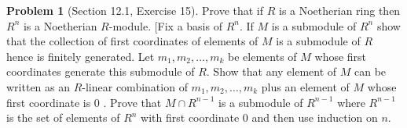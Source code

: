 \documentclass{amsart}
\numberwithin{equation}{section}
\theoremstyle{definition}
\newtheorem{problem}[thm]{Problem}
\begin{document}
\begin{problem}[Section 12.1, Exercise 15]
Prove that if \(R\) is a Noetherian ring then \(R^n\) is a Noetherian \(R\)-module. [Fix a basis of \(R^n\). If \(M\) is a submodule of \(R^n\) show that the collection of first coordinates of elements of \(M\) is a submodule of \(R\) hence is finitely generated. Let \(m_1, m_2, \ldots, m_k\) be elements of \(M\)
whose first coordinates generate this submodule of \(R\). Show that any element of \(M\) can be written as an \(R\)-linear combination of \(m_1, m_2, \ldots, m_k\) plus an element of \(M\) whose first coordinate is 0 . Prove that \(M \cap R^{n-1}\) is a submodule of \(R^{n-1}\) where \(R^{n-1}\) is the set of elements of \(R^n\) with first coordinate 0 and then use induction on \(n\).
\end{problem}








\end{document}
